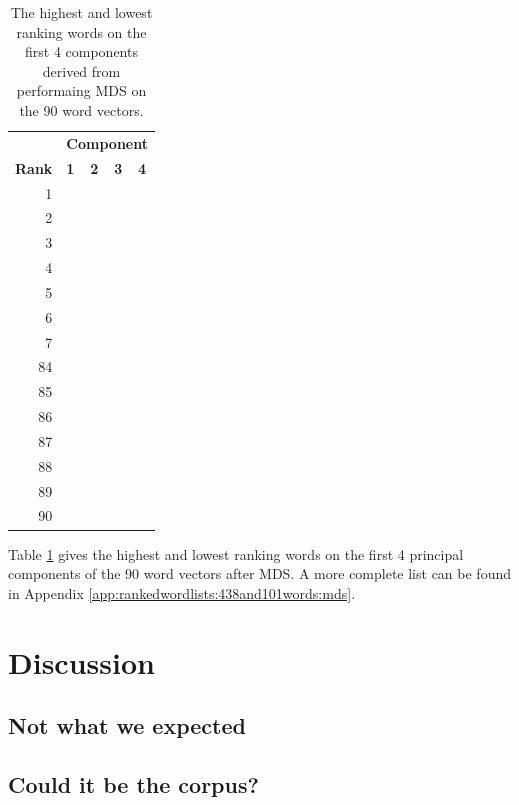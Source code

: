 \documentclass[10pt,letterpaper]{book}
\begin{document}
\begin{table}[!htbp]
    \begin{tabular}{| rllll | }
        \hline
         & \multicolumn{4}{c|}{\textbf{Component}} \\
        \textbf{Rank} & \textbf{1} & \textbf{2} & \textbf{3} & \textbf{4} \\
        \hline
        1 &  &  &  &  \\
        2 &  &  &  &  \\
        3 &  &  &  &  \\
        4 &  &  &  &  \\
        5 &  &  &  &  \\
        6 &  &  &  &  \\
        7 &  &  &  &  \\
        \hline
        84 &  &  &  &  \\
        85 &  &  &  &  \\
        86 &  &  &  &  \\
        87 &  &  &  &  \\
        88 &  &  &  &  \\
        89 &  &  &  &  \\
        90 &  &  &  &  \\
        \hline
    \end{tabular}
    \caption{The highest and lowest ranking words on the first 4 components 
    derived from performaing MDS on the 90 word vectors.}
    \label{tab:438and101wordsRankingsMDS}
\end{table}

Table \ref{tab:438and101wordsRankingsMDS} gives the highest and lowest
ranking words on the first 4 principal components of the 90 word 
vectors after MDS. A more complete list can be found in Appendix 
\ref{app:rankedwordlists:438and101words:mds}.


\chapter{Discussion}

\section{Not what we expected}

\section{Could it be the corpus?}
\end{document}
